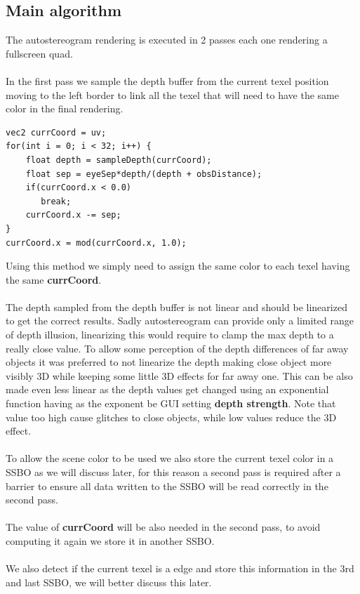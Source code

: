 \documentclass[12pt, a4paper]{article}
\begin{document}
\subsection{Main algorithm}
The autostereogram rendering is executed in 2 passes each one rendering a fullscreen quad.\\\\
In the first pass we sample the depth buffer from the current texel position moving to the left border to link
all the texel that will need to have the same color in the final rendering.
\begin{lstlisting}[caption={Autostereogram depth sampling},captionpos=b]
vec2 currCoord = uv;
for(int i = 0; i < 32; i++) {
    float depth = sampleDepth(currCoord);
    float sep = eyeSep*depth/(depth + obsDistance);
    if(currCoord.x < 0.0)
       break;
    currCoord.x -= sep;
}
currCoord.x = mod(currCoord.x, 1.0);
\end{lstlisting}
Using this method we simply need to assign the same color to each texel having the same \textbf{currCoord}.\\\\
The depth sampled from the depth buffer is not linear and should be linearized to get the correct results.
Sadly autostereogram can provide only a limited range of depth illusion, linearizing this would require to clamp the max depth
to a really close value. To allow some perception of the depth differences of far away objects it was preferred to not linearize
the depth making close object more visibly 3D while keeping some little 3D effects for far away one. This can be also made even less linear
as the depth values get changed using an exponential function having as the exponent be GUI setting \textbf{depth strength}. Note that value too high
cause glitches to close objects, while low values reduce the 3D effect.\\\\
To allow the scene color to be used we also store the current texel color in a SSBO as we will discuss later, for this
reason a second pass is required after a barrier to ensure all data written to the SSBO will be read correctly in the second pass.\\\\
The value of \textbf{currCoord} will be also needed in the second pass, to avoid computing it again we store it in another SSBO.\\\\
We also detect if the current texel is a edge and store this information in the 3rd and last SSBO, we will better discuss this later.
\end{document}
